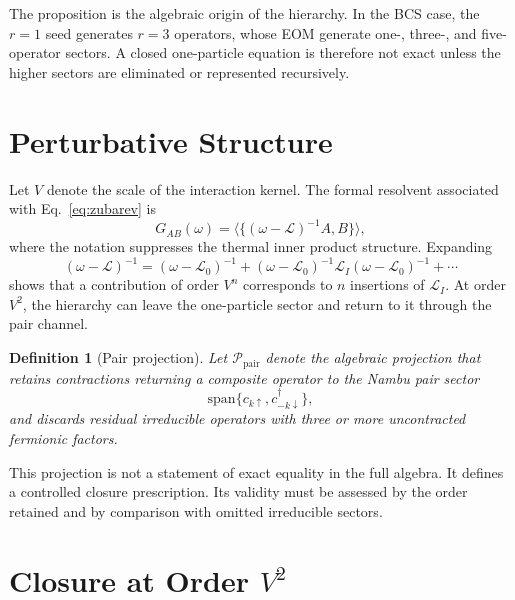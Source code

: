 \documentclass[aps,prb,reprint,superscriptaddress,nofootinbib]{revtex4-2}
\newtheorem{definition}{Definition}
\newcommand{\Liouv}{\mathcal{L}}
\newcommand{\Pc}{\mathcal{P}}
\begin{document}
The proposition is the algebraic origin of the hierarchy. In the BCS case, the \(r=1\) seed generates \(r=3\) operators, whose EOM generate one-, three-, and five-operator sectors. A closed one-particle equation is therefore not exact unless the higher sectors are eliminated or represented recursively.

\section{Perturbative Structure}

Let \(V\) denote the scale of the interaction kernel. The formal resolvent associated with Eq.~\eqref{eq:zubarev} is
\begin{equation}
G_{AB}(\omega)
= \langle\{(\omega-\Liouv)^{-1}A,B\}\rangle,
\end{equation}
where the notation suppresses the thermal inner product structure. Expanding
\begin{equation}
(\omega-\Liouv)^{-1}
= (\omega-\Liouv_0)^{-1}
+(\omega-\Liouv_0)^{-1}\Liouv_I(\omega-\Liouv_0)^{-1}
+\cdots
\end{equation}
shows that a contribution of order \(V^n\) corresponds to \(n\) insertions of \(\Liouv_I\). At order \(V^2\), the hierarchy can leave the one-particle sector and return to it through the pair channel.

\begin{definition}[Pair projection]
Let \(\Pc_{\mathrm{pair}}\) denote the algebraic projection that retains contractions returning a composite operator to the Nambu pair sector
\begin{equation}
\mathrm{span}\{c_{k\uparrow},c^\dagger_{-k\downarrow}\},
\end{equation}
and discards residual irreducible operators with three or more uncontracted fermionic factors.
\end{definition}

This projection is not a statement of exact equality in the full algebra. It defines a controlled closure prescription. Its validity must be assessed by the order retained and by comparison with omitted irreducible sectors.

\section{Closure at Order \(V^2\)}
\end{document}
